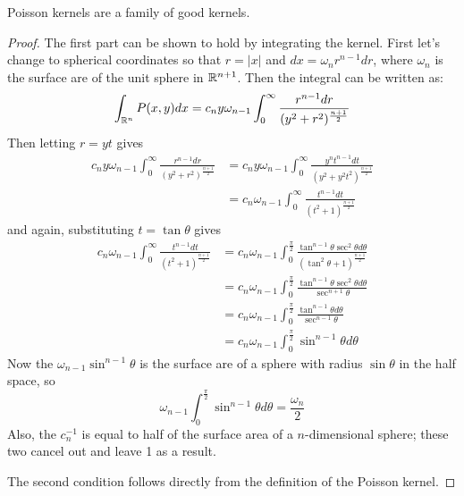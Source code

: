 \begin{lemma}
    Poisson kernels are a family of good kernels.
\end{lemma}
\begin{proof}
    The first part can be shown to hold by integrating the kernel. First let's change to spherical coordinates so that $r=|x|$ and $dx=\omega_nr^{n-1}dr$, where $\omega_n$ is the surface are of the unit sphere in $\mathbb R^{n+1}$. Then the integral can be written as:
    \begin{equation*}
        \int_{\mathbb R^n}P(x,y)dx=c_ny\omega_{n-1}\int_0^\infty\frac{r^{n-1}dr}{(y^2+r^2)^{\frac{n+1}{2}}}
    \end{equation*}
    Then letting $r=yt$ gives
    \begin{align*}
        c_ny\omega_{n-1}\int_0^\infty\frac{r^{n-1}dr}{(y^2+r^2)^{\frac{n+1}{2}}}&=c_ny\omega_{n-1}\int_0^\infty\frac{y^{n}t^{n-1}dt}{(y^2+y^2t^2)^{\frac{n+1}{2}}} \\
        &=c_n\omega_{n-1}\int_0^\infty \frac{t^{n-1}dt}{(t^2+1)^{\frac{n+1}{2}}}
    \end{align*}
    and again, substituting $t=\tan\theta$ gives
    \begin{align*}
        c_n\omega_{n-1}\int_0^\infty \frac{t^{n-1}dt}{(t^2+1)^{\frac{n+1}{2}}}&=c_n\omega_{n-1}\int_0^\frac{\pi}{2} \frac{\tan^{n-1}\theta\sec^2\theta d\theta}{(\tan^2\theta+1)^{\frac{n+1}{2}}} \\
        &=c_n\omega_{n-1}\int_0^\frac{\pi}{2} \frac{\tan^{n-1}\theta\sec^2\theta d\theta}{\sec^{n+1}\theta} \\
        &=c_n\omega_{n-1}\int_0^\frac{\pi}{2} \frac{\tan^{n-1}\theta d\theta}{\sec^{n-1}\theta} \\
        &=c_n\omega_{n-1}\int_0^\frac{\pi}{2}\sin^{n-1}\theta d\theta
    \end{align*}
    Now the $\omega_{n-1}\sin^{n-1}\theta$ is the surface are of a sphere with radius $\sin\theta$ in the half space, so
    \begin{equation*}
        \omega_{n-1}\int_0^\frac{\pi}{2}\sin^{n-1}\theta d\theta=\frac{\omega_n}{2}
    \end{equation*}
    Also, the $c_n^{-1}$ is equal to half of the surface area of a $n$-dimensional sphere; these two cancel out and leave 1 as a result. 

    The second condition follows directly from the definition of the Poisson kernel.


\end{proof}
